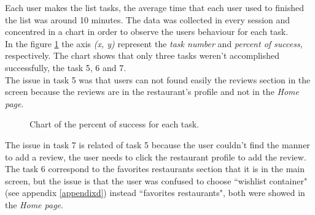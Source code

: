 Each user makes the list tasks, the average time that each user used
to finished the list was around 10 minutes. The data was collected in
every session and concentred in a chart in order to observe the users
behaviour for each task. \\ In the figure \ref{fig:tsuccess} the axis 
\textit{(x, y)} represent the \textit{task number} and \textit{percent 
of success},  respectively. The chart shows that only
three tasks weren't accomplished successfully, the task 5, 6 and 7. \\ 
The issue in task 5 was that users can not found easily the reviews
section in the screen because the reviews are in the restaurant's
profile and not in the \textit{Home page}. 
\begin{figure}
\centering
\captionsetup{font=footnotesize}
\caption{Chart of the percent of success for each task.}
\label{fig:tsuccess}   
\end{figure}
The issue in task 7 is related of
task 5 because the user couldn't find the manner to add a review, the
user needs to click the restaurant profile to add the review. The task
6 correspond to the favorites restaurants section that it is in the
main screen, but the issue is that the user was confused to choose
``wishlist container" (see appendix \ref{appendixd}) instead 
``favorites restaurants", both were showed in the \textit{Home page}.\\ 
